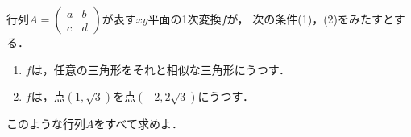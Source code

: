 \documentclass[../../main.tex]{subfiles}
\begin{document}
行列$A=
\begin{pmatrix} a & b \\ c & d
\end{pmatrix}$が表す$xy$平面の1次変換$f$が，
次の条件(1)，(2)をみたすとする．
\begin{enumerate}
  \item $f$は，任意の三角形をそれと相似な三角形にうつす．
  \item $f$は，点$(1,\sqrt3)$を点$(-2,2\sqrt3)$にうつす．
\end{enumerate}
このような行列$A$をすべて求めよ．
\end{document}
